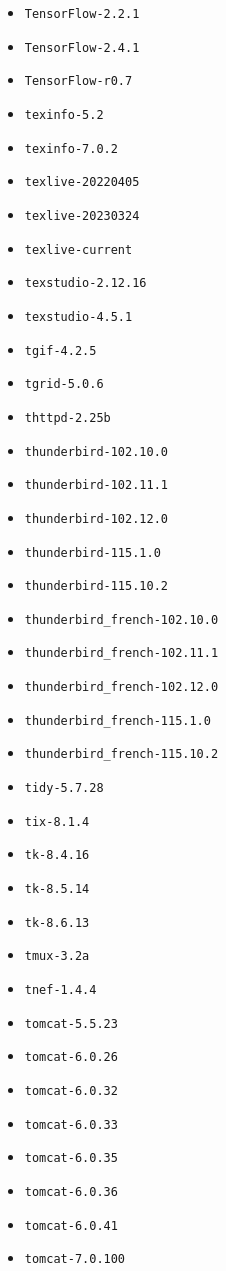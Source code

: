 \begin{multicols}{3}
\begin{itemize}
\item \verb|TensorFlow-2.2.1|
\item \verb|TensorFlow-2.4.1|
\item \verb|TensorFlow-r0.7|
\item \verb|texinfo-5.2|
\item \verb|texinfo-7.0.2|
\item \verb|texlive-20220405|
\item \verb|texlive-20230324|
\item \verb|texlive-current|
\item \verb|texstudio-2.12.16|
\item \verb|texstudio-4.5.1|
\item \verb|tgif-4.2.5|
\item \verb|tgrid-5.0.6|
\item \verb|thttpd-2.25b|
\item \verb|thunderbird-102.10.0|
\item \verb|thunderbird-102.11.1|
\item \verb|thunderbird-102.12.0|
\item \verb|thunderbird-115.1.0|
\item \verb|thunderbird-115.10.2|
\item \verb|thunderbird_french-102.10.0|
\item \verb|thunderbird_french-102.11.1|
\item \verb|thunderbird_french-102.12.0|
\item \verb|thunderbird_french-115.1.0|
\item \verb|thunderbird_french-115.10.2|
\item \verb|tidy-5.7.28|
\item \verb|tix-8.1.4|
\item \verb|tk-8.4.16|
\item \verb|tk-8.5.14|
\item \verb|tk-8.6.13|
\item \verb|tmux-3.2a|
\item \verb|tnef-1.4.4|
\item \verb|tomcat-5.5.23|
\item \verb|tomcat-6.0.26|
\item \verb|tomcat-6.0.32|
\item \verb|tomcat-6.0.33|
\item \verb|tomcat-6.0.35|
\item \verb|tomcat-6.0.36|
\item \verb|tomcat-6.0.41|
\item \verb|tomcat-7.0.100|

\end{itemize}
\end{multicols}

